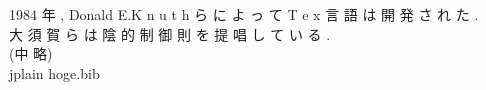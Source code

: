 \documentclass[dvipdfmx,uplatex]{jsarticle}
\begin{document}
1984 年 , Donald E.K n u t h ら に よ っ て T e x 言 語 は 開 発 さ れ た \cite{Kunth84literateprogramming}. \\
大 須 賀 ら \cite{osuka_2010_ImplicitControl} は 陰 的 制 御 則 を 提 唱 し て い る . \\

(中 略)\\

 {jplain}
 {hoge.bib}
\end{document}
